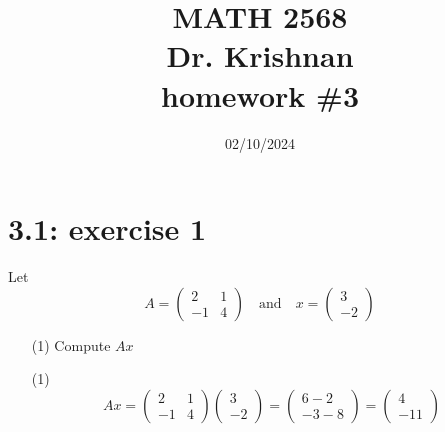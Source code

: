\documentclass{report}
\title{\Huge{MATH 2568}\\\huge{Dr. Krishnan}\\homework \#3}
\author{\Huge{\mylink{https://www.sohumsuthar.com}{Sohum Suthar}}}
\date{\huge {02/10/2024}}
\begin{document}
\maketitle
\newpage
{}	
\tableofcontents
\pagebreak





\section*{3.1: exercise 1} 

Let
\begin{equation}
A = \begin{pmatrix} 2 & 1 \\ -1 & 4 \end{pmatrix} \quad \text{and} \quad x = \begin{pmatrix} 3 \\ -2 \end{pmatrix}
\end{equation}


\begin{enumerate}
    \item[(1)] Compute $Ax$





    
\end{enumerate}

\sol

\begin{enumerate}
\item[(1)]
\[
Ax =
\left(\begin{array}{rr} 2 & 1 \\ -1 & 4\end{array}\right)
\left(\begin{array}{r} 3 \\ -2\end{array}\right) =
\left(\begin{array}{r} 6 - 2 \\ -3 - 8\end{array}\right) =
\boxed{\left(\begin{array}{r} 4 \\ -11\end{array}\right)}
\]
\end{enumerate}
\end{document}
